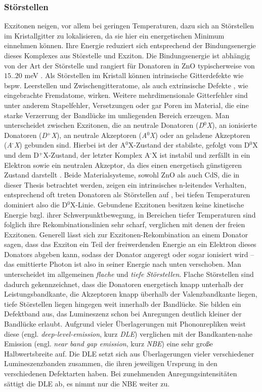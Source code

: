 \subsubsection{Störstellen}
Exzitonen neigen, vor allem bei geringen Temperaturen, dazu sich an Störstellen im Kristallgitter zu lokalisieren, da sie hier ein energetischen Minimum einnehmen können. Ihre Energie reduziert sich entsprechend der Bindungsenergie dieses Komplexes aus Störstelle und Exziton. Die Bindungsenergie ist abhängig von der Art der Störstelle und rangiert für Donatoren in ZnO typischerweise von $15..20$ meV \cite{Meyer.2004}. Als Störstellen im Kristall können intrinsische Gitterdefekte wie bspw. Leerstellen und Zwischengitteratome, als auch extrinsische Defekte , wie eingebrachte Fremdatome, wirken. Weitere mehrdimensionale Gitterfehler sind unter anderem Stapelfehler, Versetzungen oder gar Poren im Material, die eine starke Verzerrung der Bandlücke im umliegenden Bereich erzeugen.  Man unterscheidet zwischen Exzitonen, die an neutrale Donatoren (\textit{D$^\text{0}$X}), an ionisierte Donatoren (\textit{D$^\text{+}$X}), an neutrale Akzeptoren (\textit{A$^\text{0}$X}) oder an geladene Akzeptoren (\textit{A$^\text{-}$X}) gebunden sind. Hierbei ist der A$^\text{0}$X-Zustand der stabilste, gefolgt vom D$^\text{0}$X und dem D$^\text{+}$X-Zustand, der letzter Komplex A$^\text{-}$X ist instabil und zerfällt in ein Elektron sowie ein neutralen Akzeptor, da dies einen energetisch günstigeren Zustand darstellt \cite{Klingshirn.2007}. Beide Materialsysteme, sowohl ZnO als auch CdS, die in dieser Thesis betrachtet werden, zeigen ein intrinsisches n-leitendes Verhalten, entsprechend oft treten Donatoren als Störstellen auf \cite{Ozgur.2005}, bei tiefen Temperaturen dominiert also die D$^\text{0}$X-Linie. Gebundene Exzitonen besitzen keine kinetische Energie bzgl. ihrer Schwerpunktbewegung, in Bereichen tiefer Temperaturen sind folglich ihre Rekombinationslinien sehr scharf, verglichen mit denen der freien Exzitonen. Generell lässt sich zur Exzitonen-Rekombination an einem Donator sagen, dass das Exziton ein Teil der freiwerdenden Energie an ein Elektron dieses Donators abgeben kann, sodass der Donator angeregt oder sogar ionisiert wird – das emittierte Photon ist also in seiner Energie nach unten verschoben. Man unterscheidet im allgemeinen \textit{flache} und \textit{tiefe Störstellen}. Flache Störstellen sind dadurch gekennzeichnet, dass die Donatoren energetisch knapp unterhalb der Leistungsbandkante, die Akzeptoren knapp überhalb der Valenzbandkante liegen, tiefe Störstellen liegen hingegen weit innerhalb der Bandlücke. Sie bilden ein Defektband aus, das Lumineszenz schon bei Anregungen deutlich kleiner der Bandlücke erlaubt. Aufgrund vieler Überlagerungen mit Phononrepliken weist diese (engl. \textit{deep-level-emission}, kurz \textit{DLE}) verglichen mit der Bandkanten-nahe Emission (engl. \textit{near band gap emission}, kurz \textit{NBE}) eine sehr große Halbwertsbreite auf. Die DLE setzt sich aus Überlagerungen vieler verschiedener Lumineszenzbanden zusammen, die ihren jeweiligen Ursprung in den verschiedenen Defektarten haben. Bei zunehmenden Anregungsintensitäten sättigt die DLE ab, es nimmt nur die NBE weiter zu.

